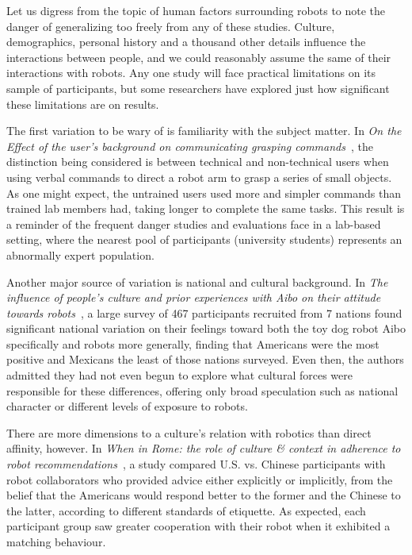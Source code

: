 \documentclass{sfuthesis}
\begin{document}
Let us digress from the topic of human factors surrounding robots to note the danger of generalizing too freely from any of these studies. Culture, demographics, personal history and a thousand other details influence the interactions between people, and we could reasonably assume the same of their interactions with robots. Any one study will face practical limitations on its sample of participants, but some researchers have explored just how significant these limitations are on results.

The first variation to be wary of is familiarity with the subject matter. In \textit{On the Effect of the user's background on communicating grasping commands}~\cite{ralph2006effect}, the distinction being considered is between technical and non-technical users when using verbal commands to direct a robot arm to grasp a series of small objects. As one might expect, the untrained users used more and simpler commands than trained lab members had, taking longer to complete the same tasks. This result is a reminder of the frequent danger studies and evaluations face in a lab-based setting, where the nearest pool of participants (university students) represents an abnormally expert population.


Another major source of variation is national and cultural background. In \textit{The influence of people's culture and prior experiences with Aibo on their attitude towards robots}~\cite{bartneck2007influence}, a large survey of 467 participants recruited from 7 nations found significant national variation on their feelings toward both the toy dog robot Aibo specifically and robots more generally, finding that Americans were the most positive and Mexicans the least of those nations surveyed. Even then, the authors admitted they had not even begun to explore what cultural forces were responsible for these differences, offering only broad speculation such as national character or different levels of exposure to robots.

There are more dimensions to a culture's relation with robotics than direct affinity, however. In \textit{When in Rome: the role of culture & context in adherence to robot recommendations}~\cite{wang2010rome}, a study compared U.S. vs. Chinese participants with robot collaborators who provided advice either explicitly or implicitly, from the belief that the Americans would respond better to the former and the Chinese to the latter, according to different standards of etiquette. As expected, each participant group saw greater cooperation with their robot when it exhibited a matching behaviour.
\end{document}
